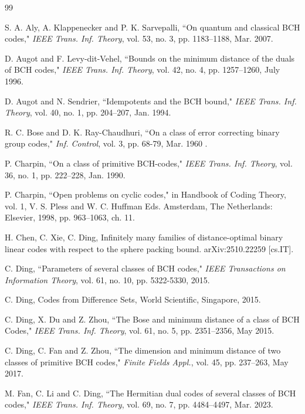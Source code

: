 \documentclass[12pt,draftcls,journal,onecolumn]{IEEEtran}
\begin{document}
\begin{thebibliography}{99}



 S. A. Aly, A. Klappenecker and P. K. Sarvepalli,  ``On quantum
and classical BCH codes," {\it IEEE Trans. Inf. Theory}, vol. 53, no. 3, pp. 1183--1188, Mar. 2007.

 D. Augot and F. Levy-dit-Vehel, ``Bounds on the minimum distance of the duals of BCH codes," {\it IEEE Trans. Inf. Theory}, vol. 42, no. 4, pp. 1257--1260, July 1996.

 D. Augot and N. Sendrier,  ``Idempotents and the BCH bound," {\it IEEE
Trans. Inf. Theory}, vol. 40, no. 1, pp. 204--207, Jan. 1994.

 R. C. Bose and D. K. Ray-Chaudhuri, ``On a class of error correcting binary group codes," {\it Inf. Control},  vol. 3, pp. 68-79, Mar. 1960 .


 P. Charpin, ``On a class of primitive BCH-codes," {\it IEEE Trans. Inf.
Theory}, vol. 36, no. 1, pp. 222--228, Jan. 1990.



 P. Charpin, ``Open problems on cyclic codes," in Handbook of Coding
Theory, vol. 1, V. S. Pless and W. C. Huffman Eds. Amsterdam,
The Netherlands: Elsevier, 1998, pp. 963--1063, ch. 11.


 H. Chen, C. Xie, C. Ding, Infinitely many families of distance-optimal binary linear codes with respect to the sphere packing bound. 	arXiv:2510.22259 [cs.IT].

 C. Ding, ``Parameters of several classes of BCH codes," {\it IEEE Transactions on Information Theory}, vol. 61, no. 10, pp. 5322-5330, 2015.

 C. Ding, Codes from Difference Sets,  World Scientific, Singapore, 2015.

 C. Ding, X. Du and Z. Zhou, ``The Bose and minimum distance
of a class of BCH Codes," {\it IEEE Trans. Inf. Theory}, vol. 61, no. 5, pp. 2351--2356, May 2015.

 C. Ding, C. Fan and Z. Zhou, ``The dimension and minimum distance of two
classes of primitive BCH codes," {\it Finite Fields Appl.}, vol. 45, pp. 237--263, May 2017.

 M. Fan, C. Li and C. Ding, ``The Hermitian dual codes of several classes of BCH codes," {\it IEEE Trans. Inf. Theory}, vol. 69, no. 7, pp. 4484--4497, Mar. 2023.



\end{thebibliography}
\end{document}
